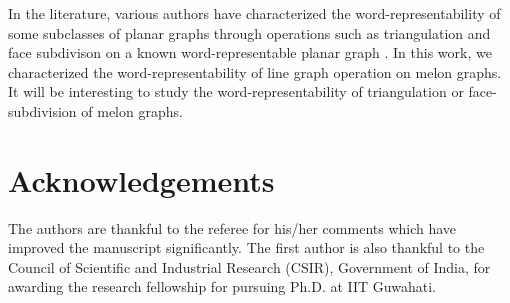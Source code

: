 \documentclass{llncs}
\begin{document}
In the literature, various authors have characterized   the word-representability of some subclasses of planar graphs through operations such as triangulation and face subdivison on a known word-representable planar graph \cite{Akrobotu_2015,chen_2016,Glen_2017}. In this work, we characterized the word-representability of line graph operation on  melon graphs. It will be interesting to study the word-representability of triangulation or face-subdivision of melon graphs.                         



\section{Acknowledgements}
	The authors are thankful to the referee for his/her comments which have improved the manuscript significantly. The first author is also thankful to the Council of Scientific and Industrial Research (CSIR), Government of India, for awarding the research fellowship for pursuing Ph.D. at IIT Guwahati.
\end{document}
